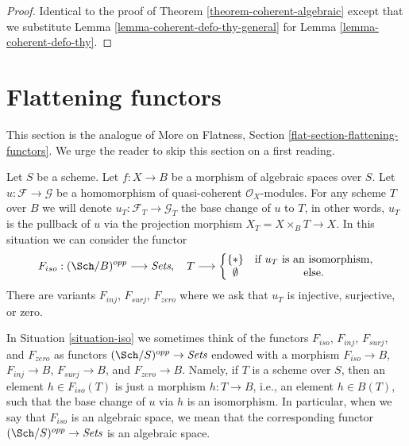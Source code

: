 \begin{proof}
Identical to the proof of Theorem \ref{theorem-coherent-algebraic}
except that we substitute
Lemma \ref{lemma-coherent-defo-thy-general} for
Lemma \ref{lemma-coherent-defo-thy}.
\end{proof}









\section{Flattening functors}
\label{section-F-zero}

\noindent
This section is the analogue of
More on Flatness, Section \ref{flat-section-flattening-functors}.
We urge the reader to skip this section on a first reading.

\begin{situation}
\label{situation-iso}
Let $S$ be a scheme.
Let $f : X \to B$ be a morphism of algebraic spaces over $S$.
Let $u : \mathcal{F} \to \mathcal{G}$ be a homomorphism of
quasi-coherent $\mathcal{O}_X$-modules. For any scheme $T$ over
$B$ we will denote $u_T : \mathcal{F}_T \to \mathcal{G}_T$ the
base change of $u$ to $T$, in other words, $u_T$ is the pullback
of $u$ via the projection morphism $X_T = X \times_B T \to X$.
In this situation we can consider the functor
\begin{equation}
\label{equation-iso}
F_{iso} : (\Sch/B)^{opp} \longrightarrow \textit{Sets}, \quad
T \longrightarrow \left\{
\begin{matrix}
\{*\} & \text{if }u_T\text{ is an isomorphism}, \\
\emptyset & \text{else.}
\end{matrix}
\right.
\end{equation}
There are variants $F_{inj}$, $F_{surj}$, $F_{zero}$ where we ask that
$u_T$ is injective, surjective, or zero.
\end{situation}

\noindent
In Situation \ref{situation-iso} we sometimes think of the functors
$F_{iso}$, $F_{inj}$, $F_{surj}$, and $F_{zero}$ as functors
$(\Sch/S)^{opp} \to \textit{Sets}$ endowed with a morphism
$F_{iso} \to B$, $F_{inj} \to B$, $F_{surj} \to B$, and $F_{zero} \to B$.
Namely, if $T$ is a scheme over $S$, then an element $h \in F_{iso}(T)$
is just a morphism $h : T \to B$, i.e., an element $h \in B(T)$,
such that the base change of $u$ via $h$ is an isomorphism.
In particular, when we say
that $F_{iso}$ is an algebraic space, we mean that the corresponding
functor $(\Sch/S)^{opp} \to \textit{Sets}$ is an algebraic space.


